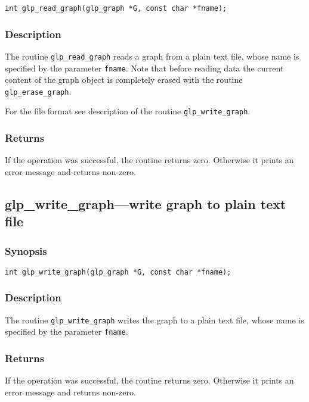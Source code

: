 \begin{verbatim}
int glp_read_graph(glp_graph *G, const char *fname);
\end{verbatim}

\subsubsection*{Description}

The routine \verb|glp_read_graph| reads a graph from a plain text file,
whose name is specified by the parameter \verb|fname|. Note that before
reading data the current content of the graph object is completely
erased with the routine \verb|glp_erase_graph|.

For the file format see description of the routine
\verb|glp_write_graph|.

\subsubsection*{Returns}

If the operation was successful, the routine returns zero. Otherwise
it prints an error message and returns non-zero.

\subsection{glp\_write\_graph---write graph to plain text file}

\subsubsection*{Synopsis}

\begin{verbatim}
int glp_write_graph(glp_graph *G, const char *fname);
\end{verbatim}

\subsubsection*{Description}

The routine \verb|glp_write_graph| writes the graph to a plain text
file, whose name is specified by the parameter \verb|fname|.

\subsubsection*{Returns}

If the operation was successful, the routine returns zero. Otherwise
it prints an error message and returns non-zero.

